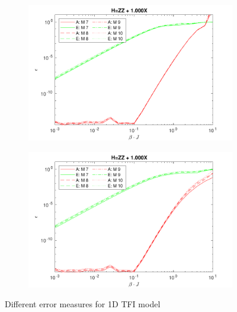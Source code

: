 \begin{figure}[!htbp]
  \begin{subfigure}[]{\linewidth}
    \includegraphics[width=\textwidth]{Figuren/benchmarking/comp_M_cycl.pdf}
  \end{subfigure}
  \begin{subfigure}[]{\linewidth}
    \includegraphics[width=\textwidth]{Figuren/benchmarking/Comp_M_lin.pdf}
  \end{subfigure}
  \caption{ Different error measures for 1D \Gls{TFI} model }
  \label{benchmarking:systemsize}
\end{figure}

\def \expHBlock {\expH{4}{ $e^{- \beta \hat{H}_{n}}$   }{ {,,"...",} }{ {,,"...",} }{}{} }
\def \Mn {\mpo{4}{ {0,,,,0}  }{}{}{{0,0,1,0,0}}{}}

